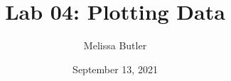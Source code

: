 \newcommand{\course}{MATH 3341}
\title{Lab 04: Plotting Data}
\author{Melissa Butler}
\date{September 13, 2021}
